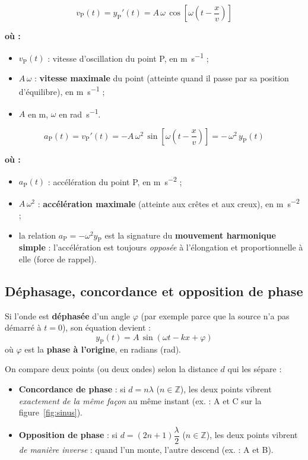 \documentclass[11pt,a4paper]{article}
\newenvironment{ou}{%
  \par\smallskip\noindent\textbf{où :}\nopagebreak
  \begin{itemize}[leftmargin=1.8em,topsep=2pt,itemsep=1.5pt,parsep=0pt]}%
  {\end{itemize}}
\begin{document}
\begin{formule}
\[ \boxed{\,v_{\mathrm P}(t) = y_{\mathrm P}'(t)
   = A\,\omega\,\cos\!\left[\omega\!\left(t-\frac{x}{v}\right)\right]\,} \]
\begin{ou}
  \item $v_{\mathrm P}(t)$ : vitesse d'oscillation du point P, en \si{\metre\per\second} ;
  \item $A\,\omega$ : \textbf{vitesse maximale} du point (atteinte quand il passe par sa
        position d'équilibre), en \si{\metre\per\second} ;
  \item $A$ en \si{\metre}, $\omega$ en \si{\radian\per\second}.
\end{ou}
\end{formule}

\begin{formule}
\[ \boxed{\,a_{\mathrm P}(t) = v_{\mathrm P}'(t)
   = -A\,\omega^{2}\,\sin\!\left[\omega\!\left(t-\frac{x}{v}\right)\right]
   = -\,\omega^{2}\,y_{\mathrm P}(t)\,} \]
\begin{ou}
  \item $a_{\mathrm P}(t)$ : accélération du point P, en \si{\metre\per\second\squared} ;
  \item $A\,\omega^{2}$ : \textbf{accélération maximale} (atteinte aux crêtes et aux creux), en
        \si{\metre\per\second\squared} ;
  \item la relation $a_{\mathrm P} = -\omega^{2}y_{\mathrm P}$ est la signature du
        \textbf{mouvement harmonique simple} : l'accélération est toujours \emph{opposée} à
        l'élongation et proportionnelle à elle (force de rappel).
\end{ou}
\end{formule}

\subsection{Déphasage, concordance et opposition de phase}

Si l'onde est \textbf{déphasée} d'un angle $\varphi$ (par exemple parce que la source n'a pas
démarré à $t=0$), son équation devient :
\[ \boxed{\,y_{\mathrm P}(t) = A\,\sin(\omega t - k x + \varphi)\,} \]
où $\varphi$ est la \textbf{phase à l'origine}, en radians (\si{\radian}).

\begin{definition}
On compare deux points (ou deux ondes) selon la distance $d$ qui les sépare :
\begin{itemize}[leftmargin=1.5em,topsep=2pt,itemsep=2pt]
  \item \textbf{Concordance de phase} : si $d = n\lambda$ ($n\in\mathbb{Z}$), les deux points
        vibrent \emph{exactement de la même façon} au même instant (ex. : A et C
        sur la figure~\ref{fig:sinus}).
  \item \textbf{Opposition de phase} : si $d = (2n+1)\dfrac{\lambda}{2}$ ($n\in\mathbb{Z}$),
        les deux points vibrent \emph{de manière inverse} : quand l'un monte, l'autre descend
        (ex. : A et B).
\end{itemize}
\end{definition}
\end{document}
